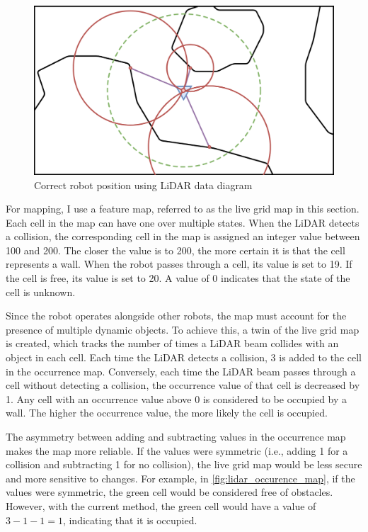 \documentclass[../main.tex]{subfiles}
\begin{document}
\begin{figure}[H]
	\centering
	\includegraphics[width=0.6\linewidth]{IMAGES/part5/lidar_correct_pos.png}
	\caption{Correct robot position using LiDAR data diagram}
	\label{fig:lidar_loca}
\end{figure}


For mapping, I use a feature map, referred to as the live grid map in this section. Each cell in the map can have one over multiple states. When the LiDAR detects a collision, the corresponding cell in the map is assigned an integer value between 100 and 200. The closer the value is to 200, the more certain it is that the cell represents a wall. When the robot passes through a cell, its value is set to 19. If the cell is free, its value is set to 20. A value of 0 indicates that the state of the cell is unknown.

\vspace{1em}

Since the robot operates alongside other robots, the map must account for the presence of multiple dynamic objects. To achieve this, a twin of the live grid map is created, which tracks the number of times a LiDAR beam collides with an object in each cell. Each time the LiDAR detects a collision, 3 is added to the cell in the occurrence map. Conversely, each time the LiDAR beam passes through a cell without detecting a collision, the occurrence value of that cell is decreased by 1. Any cell with an occurrence value above 0 is considered to be occupied by a wall. The higher the occurrence value, the more likely the cell is occupied.

\vspace{1em}

The asymmetry between adding and subtracting values in the occurrence map makes the map more reliable. If the values were symmetric (i.e., adding 1 for a collision and subtracting 1 for no collision), the live grid map would be less secure and more sensitive to changes. For example, in \autoref{fig:lidar_occurence_map}, if the values were symmetric, the green cell would be considered free of obstacles. However, with the current method, the green cell would have a value of $3-1-1=1$, indicating that it is occupied.
\end{document}
